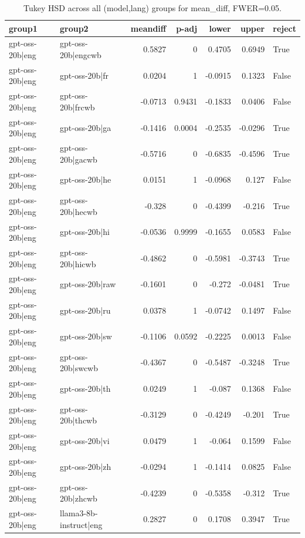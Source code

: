 \begin{table}
\caption{Tukey HSD across all (model,lang) groups for mean_diff, FWER=0.05.}
\label{tab:tukey_all_models_all_langs_mean_diff}
\begin{tabular}{l l r r r r l}
\toprule
group1 & group2 & meandiff & p-adj & lower & upper & reject \\
\midrule
gpt-oss-20b|eng & gpt-oss-20b|engcwb & 0.5827 & 0 & 0.4705 & 0.6949 & True \\
gpt-oss-20b|eng & gpt-oss-20b|fr & 0.0204 & 1 & -0.0915 & 0.1323 & False \\
gpt-oss-20b|eng & gpt-oss-20b|frcwb & -0.0713 & 0.9431 & -0.1833 & 0.0406 & False \\
gpt-oss-20b|eng & gpt-oss-20b|ga & -0.1416 & 0.0004 & -0.2535 & -0.0296 & True \\
gpt-oss-20b|eng & gpt-oss-20b|gacwb & -0.5716 & 0 & -0.6835 & -0.4596 & True \\
gpt-oss-20b|eng & gpt-oss-20b|he & 0.0151 & 1 & -0.0968 & 0.127 & False \\
gpt-oss-20b|eng & gpt-oss-20b|hecwb & -0.328 & 0 & -0.4399 & -0.216 & True \\
gpt-oss-20b|eng & gpt-oss-20b|hi & -0.0536 & 0.9999 & -0.1655 & 0.0583 & False \\
gpt-oss-20b|eng & gpt-oss-20b|hicwb & -0.4862 & 0 & -0.5981 & -0.3743 & True \\
gpt-oss-20b|eng & gpt-oss-20b|raw & -0.1601 & 0 & -0.272 & -0.0481 & True \\
gpt-oss-20b|eng & gpt-oss-20b|ru & 0.0378 & 1 & -0.0742 & 0.1497 & False \\
gpt-oss-20b|eng & gpt-oss-20b|sw & -0.1106 & 0.0592 & -0.2225 & 0.0013 & False \\
gpt-oss-20b|eng & gpt-oss-20b|swcwb & -0.4367 & 0 & -0.5487 & -0.3248 & True \\
gpt-oss-20b|eng & gpt-oss-20b|th & 0.0249 & 1 & -0.087 & 0.1368 & False \\
gpt-oss-20b|eng & gpt-oss-20b|thcwb & -0.3129 & 0 & -0.4249 & -0.201 & True \\
gpt-oss-20b|eng & gpt-oss-20b|vi & 0.0479 & 1 & -0.064 & 0.1599 & False \\
gpt-oss-20b|eng & gpt-oss-20b|zh & -0.0294 & 1 & -0.1414 & 0.0825 & False \\
gpt-oss-20b|eng & gpt-oss-20b|zhcwb & -0.4239 & 0 & -0.5358 & -0.312 & True \\
gpt-oss-20b|eng & llama3-8b-instruct|eng & 0.2827 & 0 & 0.1708 & 0.3947 & True \\

\end{tabular}
\end{table}
